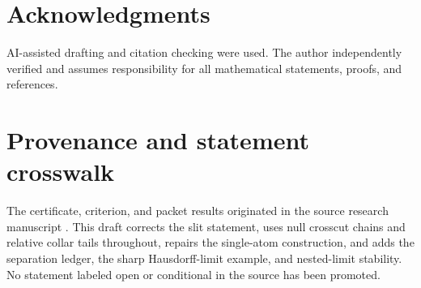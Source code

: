 \documentclass[11pt,reqno]{amsart}
\theoremstyle{definition}
\theoremstyle{remark}
\begin{document}



\section*{Acknowledgments}
AI-assisted drafting and citation checking were used.  The author
independently verified and assumes responsibility for all mathematical
statements, proofs, and references.

\appendix

\section{Provenance and statement crosswalk}\label{sec:crosswalk}

The certificate, criterion, and packet results originated in the source
research manuscript \cite{MWman}.  This draft corrects the slit statement,
uses null crosscut chains and relative collar tails throughout, repairs the
single-atom construction, and adds the separation ledger, the sharp
Hausdorff-limit example, and nested-limit stability.  No statement labeled
open or conditional in the source has been promoted.
\end{document}
